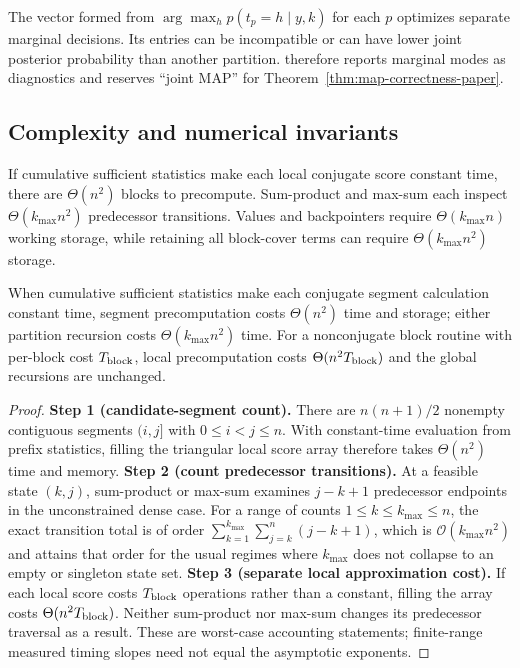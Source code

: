 \begin{cautionbox}
The vector formed from $\arg\max_h p(t_p=h\mid y,k)$ for each $p$ optimizes separate marginal decisions. Its entries can be incompatible or can have lower joint posterior probability than another partition. \BayesBreak therefore reports marginal modes as diagnostics and reserves ``joint MAP'' for Theorem~\ref{thm:map-correctness-paper}.
\end{cautionbox}



\subsection{Complexity and numerical invariants}
If cumulative sufficient statistics make each local conjugate score constant time, there are $\Theta(n^2)$ blocks to precompute. Sum-product and max-sum each inspect $\Theta(k_{\max}n^2)$ predecessor transitions. Values and backpointers require $\Theta(k_{\max}n)$ working storage, while retaining all block-cover terms can require $\Theta(k_{\max}n^2)$ storage.

\begin{proposition}[Complexity]
\label{prop:complexity-paper}
When cumulative sufficient statistics make each conjugate segment calculation constant time, segment precomputation costs $\Theta(n^2)$ time and storage; either partition recursion costs $\Theta(k_{\max}n^2)$ time. For a nonconjugate block routine with per-block cost $T_{\rm block}$, local precomputation costs $\Theta(n^2T_{\rm block})$ and the global recursions are unchanged.
\end{proposition}
\begin{proof}
\textbf{Step 1 (candidate-segment count).}
There are $n(n+1)/2$ nonempty contiguous segments $(i,j]$ with $0\le i<j\le n$. With constant-time evaluation from prefix statistics, filling the triangular local score array therefore takes $\Theta(n^2)$ time and memory.
\textbf{Step 2 (count predecessor transitions).}
At a feasible state $(k,j)$, sum-product or max-sum examines $j-k+1$ predecessor endpoints in the unconstrained dense case. For a range of counts $1\le k\le k_{\max}\le n$, the exact transition total is of order $\sum_{k=1}^{k_{\max}}\sum_{j=k}^{n}(j-k+1)$, which is $\mathcal O(k_{\max}n^2)$ and attains that order for the usual regimes where $k_{\max}$ does not collapse to an empty or singleton state set.
\textbf{Step 3 (separate local approximation cost).}
If each local score costs $T_{\rm block}$ operations rather than a constant, filling the array costs $\Theta(n^2T_{\rm block})$. Neither sum-product nor max-sum changes its predecessor traversal as a result. These are worst-case accounting statements; finite-range measured timing slopes need not equal the asymptotic exponents.
\end{proof}

